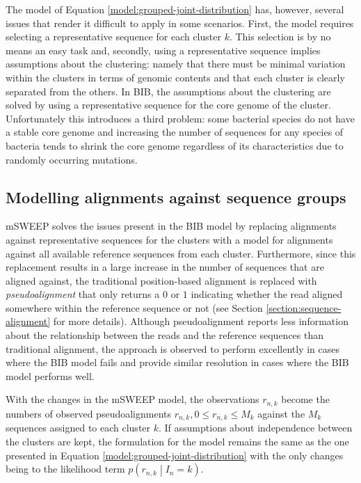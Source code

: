 \documentclass[officiallayout]{tktla}
\begin{document}
The model of Equation \ref{model:grouped-joint-distribution} has,
however, several issues that render it difficult to apply in some
scenarios. First, the model requires selecting a representative
sequence for each cluster $k$. This selection is by no means an easy
task and, secondly, using a representative sequence implies assumptions
about the clustering: namely that there must be minimal variation
within the clusters in terms of genomic contents and that each cluster
is clearly separated from the others. In BIB, the assumptions about
the clustering are solved by using a representative sequence for the
core genome of the cluster. Unfortunately this introduces a third
problem: some bacterial species do not have a stable core genome and
increasing the number of sequences for any species of bacteria tends
to shrink the core genome regardless of its characteristics due to
randomly occurring mutations.

\subsection{Modelling alignments against sequence groups}

mSWEEP solves the issues present in the BIB model by replacing
alignments against representative sequences for the clusters with a
model for alignments against all available reference sequences from
each cluster. Furthermore, since this replacement results in a large
increase in the number of sequences that are aligned against, the
traditional position-based alignment is replaced with
\textit{pseudoalignment} that only returns a $0$ or $1$ indicating
whether the read aligned somewhere within the reference sequence or
not (see Section \ref{section:sequence-alignment} for more
details). Although pseudoalignment reports less information about the
relationship between the reads and the reference sequences than
traditional alignment, the approach is observed to perform excellently
in cases where the BIB model fails and provide similar resolution in
cases where the BIB model performs well.

With the changes in the mSWEEP model, the observations $r_{n, k}$
become the numbers of observed pseudoalignments $r_{n, k}, 0 \leq
r_{n, k} \leq M_{k}$ against the $M_{k}$ sequences assigned to each
cluster $k$. If assumptions about independence between the clusters
are kept, the formulation for the model remains the same as the one
presented in Equation \ref{model:grouped-joint-distribution} with the
only changes being to the likelihood term $p\left(r_{n, k} \middle|
I_{n} = k\right)$.
\end{document}
